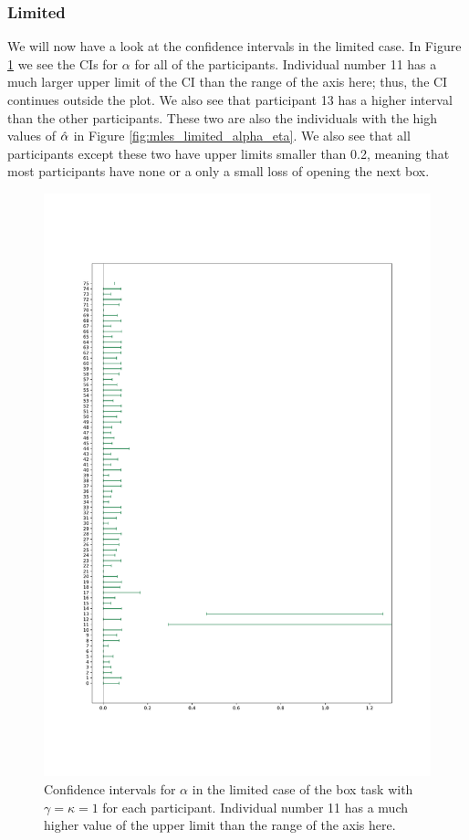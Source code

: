 \subsubsection{Limited}
We will now have a look at the confidence intervals in the limited case. In Figure \ref{fig:all_cis_alpha_lim} we see the CIs for $\alpha$ for all of the participants. Individual number 11 has a much larger upper limit of the CI than the range of the axis here; thus, the CI continues outside the plot. We also see that participant 13 has a higher interval than the other participants. These two are also the individuals with the high values of $\hat{\alpha}$ in Figure \ref{fig:mles_limited_alpha_eta}. We also see that all participants except these two have upper limits smaller than 0.2, meaning that most participants have none or a only a small loss of opening the next box. 
\begin{figure}
    \centering
    \includegraphics[scale=0.37]{pictures/all_cis_lim_alpha_pdf.pdf}
    \caption[CIs for $\alpha$, limited. $\gamma=\kappa=1$]{Confidence intervals for $\alpha$ in the limited case of the box task with $\gamma=\kappa=1$ for each participant. Individual number 11 has a much higher value of the upper limit than the range of the axis here. }
    \label{fig:all_cis_alpha_lim}
\end{figure}

